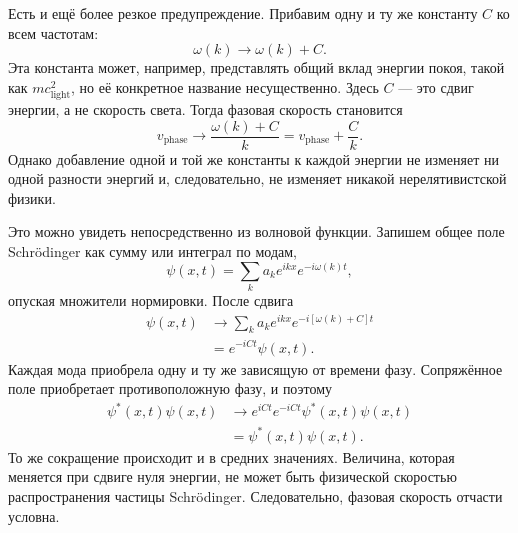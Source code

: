 Есть и ещё более резкое предупреждение. Прибавим одну и ту же константу \(C\) ко всем частотам:
\begin{equation}
\omega(k)\longrightarrow \omega(k)+C.
\end{equation}
Эта константа может, например, представлять общий вклад энергии покоя, такой как \(mc_{\mathrm{light}}^2\), но её конкретное название несущественно. Здесь \(C\) — это сдвиг энергии, а не скорость света. Тогда фазовая скорость становится
\begin{equation}
v_{\mathrm{phase}}\longrightarrow
\frac{\omega(k)+C}{k}
=v_{\mathrm{phase}}+\frac{C}{k}.
\end{equation}
Однако добавление одной и той же константы к каждой энергии не изменяет ни одной разности энергий и, следовательно, не изменяет никакой нерелятивистской физики.

Это можно увидеть непосредственно из волновой функции. Запишем общее поле Schr\"odinger как сумму или интеграл по модам,
\begin{equation}
\psi(x,t)=\sum_k a_k e^{ikx}e^{-i\omega(k)t},
\end{equation}
опуская множители нормировки. После сдвига
\begin{align}
\psi(x,t)
&\longrightarrow
\sum_k a_k e^{ikx}e^{-i[\omega(k)+C]t}
\\
&=e^{-iCt}\psi(x,t).
\end{align}
Каждая мода приобрела одну и ту же зависящую от времени фазу. Сопряжённое поле приобретает противоположную фазу, и поэтому
\begin{equation}
\begin{aligned}
\psi^*(x,t)\psi(x,t)
&\longrightarrow
e^{iCt}e^{-iCt}\psi^*(x,t)\psi(x,t)
\\
&=\psi^*(x,t)\psi(x,t).
\end{aligned}
\end{equation}
То же сокращение происходит и в средних значениях. Величина, которая меняется при сдвиге нуля энергии, не может быть физической скоростью распространения частицы Schr\"odinger. Следовательно, фазовая скорость отчасти условна.


